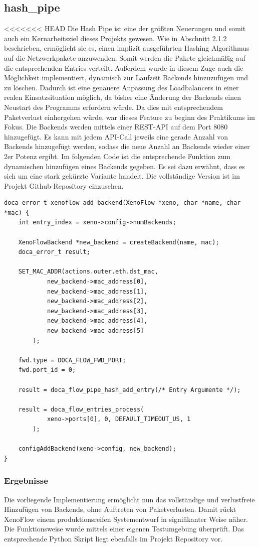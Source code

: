 \documentclass[paper=a4, fontsize=11pt]{scrartcl} %
\numberwithin{equation}{section} %
\numberwithin{figure}{section} %
\numberwithin{table}{section} %
\begin{document}
\subsection{hash\_pipe}
<<<<<<< HEAD
Die Hash Pipe ist eine der größten Neuerungen und somit auch ein Kernarbeitsziel dieses Projekts gewesen. Wie in Abschnitt 2.1.2 beschrieben, ermöglicht sie es, einen implizit ausgeführten Hashing Algorithmus auf die Netzwerkpakete anzuwenden. Somit werden die Pakete gleichmäßig auf die entsprechenden Entries verteilt. Außerdem wurde in diesem Zuge auch die Möglichkeit implementiert, dynamisch zur Laufzeit Backends hinzuzufügen und zu löschen. Dadurch ist eine genauere Anpassung des Loadbalancers in einer realen Einsatzsituation möglich, da bisher eine Änderung der Backends einen Neustart des Programms erfordern würde. Da dies mit entsprechendem Paketverlust einhergehen würde, war dieses Feature zu beginn des Praktikums im Fokus. Die Backends werden mittels einer REST-API auf dem Port 8080 hinzugefügt. Es kann mit jedem API-Call jeweils eine gerade Anzahl von Backends hinzugefügt werden, sodass die neue Anzahl an Backends wieder einer 2er Potenz ergibt. Im folgenden Code ist die entsprechende Funktion zum dynamischen hinzufügen eines Backends gegeben. Es sei dazu erwähnt, dass es sich um eine stark gekürzte Variante handelt. Die vollständige Version ist im Projekt Github-Repository einzusehen.
\begin{verbatim}
doca_error_t xenoflow_add_backend(XenoFlow *xeno, char *name, char *mac) {
	int entry_index = xeno->config->numBackends;

	XenoFlowBackend *new_backend = createBackend(name, mac);
	doca_error_t result;

	SET_MAC_ADDR(actions.outer.eth.dst_mac,
            new_backend->mac_address[0], 
            new_backend->mac_address[1], 
            new_backend->mac_address[2],
            new_backend->mac_address[3], 
            new_backend->mac_address[4], 
            new_backend->mac_address[5]
        );

	fwd.type = DOCA_FLOW_FWD_PORT;
	fwd.port_id = 0;

	result = doca_flow_pipe_hash_add_entry(/* Entry Argumente */);

	result = doca_flow_entries_process(
            xeno->ports[0], 0, DEFAULT_TIMEOUT_US, 1
        );
    
	configAddBackend(xeno->config, new_backend);
}
\end{verbatim}
\subsubsection{Ergebnisse}
Die vorliegende Implementierung ermöglicht nun das vollständige und verlustfreie Hinzufügen von Backends, ohne Auftreten von Paketverlusten. Damit rückt XenoFlow einem produktionsreifen Systementwurf in signifikanter Weise näher. Die Funktionsweise wurde mittels einer eigenen Testumgebung überprüft. Das entsprechende Python Skript liegt ebenfalls im Projekt Repository vor.
\end{document}
